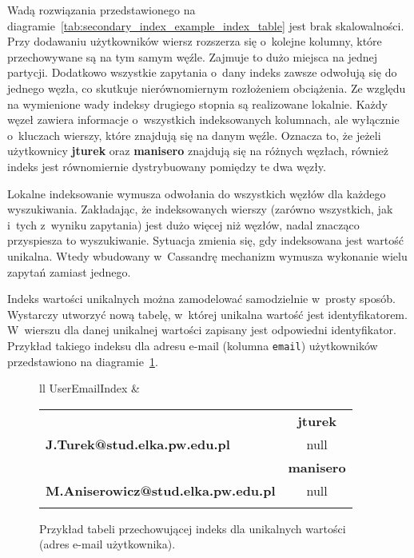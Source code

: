 Wadą rozwiązania przedstawionego na diagramie~\ref{tab:secondary_index_example_index_table} jest brak skalowalności. Przy dodawaniu użytkowników wiersz rozszerza się o~kolejne kolumny, które przechowywane są na tym samym węźle. Zajmuje to dużo miejsca na jednej partycji. Dodatkowo wszystkie zapytania o~dany indeks zawsze odwołują się do jednego węzła, co skutkuje nierównomiernym rozłożeniem obciążenia. Ze względu na wymienione wady indeksy drugiego stopnia są realizowane lokalnie. Każdy węzeł zawiera informacje o~wszystkich indeksowanych kolumnach, ale wyłącznie o~kluczach wierszy, które znajdują się na danym węźle. Oznacza to, że jeżeli użytkownicy \textbf{jturek} oraz \textbf{manisero} znajdują się na różnych węzłach, również indeks jest równomiernie dystrybuowany pomiędzy te dwa węzły.

Lokalne indeksowanie wymusza odwołania do wszystkich węzłów dla każdego wyszukiwania. Zakładając, że indeksowanych wierszy (zarówno wszystkich, jak i~tych z~wyniku zapytania) jest dużo więcej niż węzłów, nadal znacząco przyspiesza to wyszukiwanie. Sytuacja zmienia się, gdy indeksowana jest wartość unikalna. Wtedy wbudowany w~Cassandrę mechanizm wymusza wykonanie wielu zapytań zamiast jednego. 

Indeks wartości unikalnych można zamodelować samodzielnie w~prosty sposób.~\cite{unique_column_index} Wystarczy utworzyć nową tabelę, w~której unikalna wartość jest identyfikatorem. W~wierszu dla danej unikalnej wartości zapisany jest odpowiedni identyfikator. Przykład takiego indeksu dla adresu e-mail (kolumna \verb+email+) użytkowników przedstawiono na diagramie~\ref{tab:custom_unique_value_index_table}.

\begin{figure}[ht!]
	\centering

	\begin{tabular}{ll}
		UserEmailIndex &
		\begin{tabular}{|l||c|}
			\hhline{|-||-|}
		 	& \textbf{jturek} \\
			\hhline{|~||=|}
			\textbf{J.Turek@stud.elka.pw.edu.pl} & null \\
			\hhline{|=::=}
			 & \textbf{manisero} \\
			\hhline{|~||=|}
			\textbf{M.Aniserowicz@stud.elka.pw.edu.pl} & null \\
			\hhline{|-||-|}
		\end{tabular} 
	\end{tabular}

	\caption{Przykład tabeli przechowującej indeks dla unikalnych wartości (adres e-mail użytkownika).}
	\label{tab:custom_unique_value_index_table}
\end{figure}

